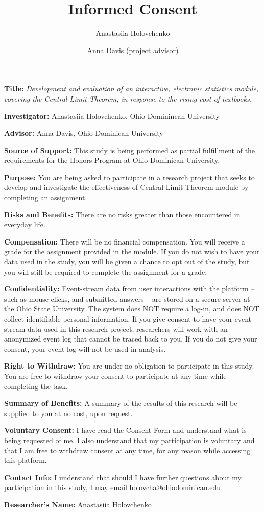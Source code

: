 \documentclass{ximera}
\author{Anastasiia Holovchenko \and Anna Davis (project advisor)} \title{Informed Consent}
\begin{document}
\begin{abstract}
\end{abstract}
\maketitle 

\textbf{Title:} \emph{Development and evaluation of an interactive, electronic statistics module, covering the Central Limit Theorem, in response to the rising cost of textbooks.}

\textbf{Investigator:} Anastasiia Holovchenko, Ohio Dominincan University

\textbf{Advisor:} Anna Davis, Ohio Dominican University

\textbf{Source of Support:} This study is being performed as partial fulfillment of the requirements for the Honors Program at Ohio Dominican University.

\textbf{Purpose:} You are being asked to participate in a research project that seeks to develop and investigate the effectiveness of Central Limit Theorem module by completing an assignment.

\textbf{Risks and Benefits:} There are no risks greater than those encountered in everyday life.

\textbf{Compensation:} There will be no financial compensation. You will receive a grade for the assignment provided in the module. If you do not wish to have your data used in the study, you will be given a chance to opt out of the study, but you will still be required to complete the assignment for a grade.

\textbf{Confidentiality:} Event-stream data from user interactions with the platform -- such as mouse clicks, and submitted answers -- are stored on a secure server at the Ohio State University.  The system does NOT require a log-in, and does NOT collect identifiable personal information.  If you give consent to have your event-stream data used in this research project, researchers will work with an anonymized event log that cannot be traced back to you. If you do not give your consent, your event log will not be used in analysis.  

\textbf{Right to Withdraw:} You are under no obligation to participate in this study.  You are free to withdraw your consent to participate at any time while completing the task. 

\textbf{Summary of Benefits:} A summary of the results of this research will be supplied to you at no cost, upon request.  

\textbf{Voluntary Consent:} I have read the Consent Form and understand what is being requested of me.  I also understand that my participation is voluntary and that I am free to withdraw consent at any time, for any reason while accessing this platform.  

\textbf{Contact Info:}  I understand that should I have further questions about my participation in this study, I may email holovcha@ohiodominican.edu

\textbf{Researcher’s Name:} Anastasiia Holovchenko
\end{document}
